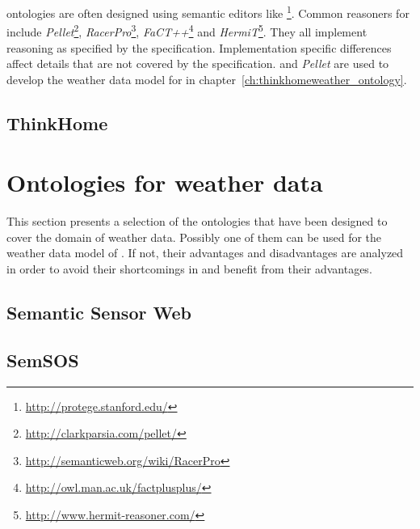
 ontologies are often designed using semantic editors like \protege\footnote{\href{http://protege.stanford.edu/}{http://protege.stanford.edu/}}. Common reasoners for  include \emph{Pellet}\footnote{\href{http://clarkparsia.com/pellet/}{http://clarkparsia.com/pellet/}}, \emph{RacerPro}\footnote{\href{http://semanticweb.org/wiki/RacerPro}{http://semanticweb.org/wiki/RacerPro}}, \emph{FaCT++}\footnote{\href{http://owl.man.ac.uk/factplusplus/}{http://owl.man.ac.uk/factplusplus/}} and \emph{HermiT}\footnote{\href{http://www.hermit-reasoner.com/}{http://www.hermit-reasoner.com/}}. They all implement reasoning as specified by the  specification. Implementation specific differences affect details that are not covered by the  specification. \protege and \emph{Pellet} are used to develop the weather data model for \thinkhome in chapter~\ref{ch:thinkhomeweather_ontology}.


\subsection{ThinkHome}


\section{Ontologies for weather data}
\label{sec:weather_ontologies}

This section presents a selection of the ontologies that have been designed to cover the domain of weather data. Possibly one of them can be used for the weather data model of \thinkhome. If not, their advantages and disadvantages are analyzed in order to avoid their shortcomings in \thinkhome and benefit from their advantages.


\subsection{Semantic Sensor Web}


\subsection{SemSOS}

